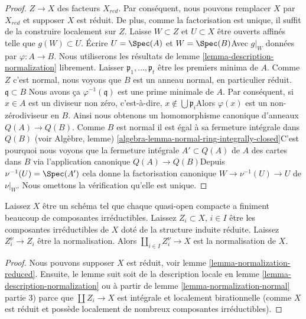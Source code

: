 \begin{proof}
$Z \to X$ des facteurs $X_{red}$. Par conséquent, nous pouvons remplacer $X$ par
$X_{red}$ et supposer $X$ est réduit. De plus, comme la factorisation est unique, il suffit de la construire localement sur $Z$. Laisse $W \subset Z$ et $U \subset X$ être ouverts affinés telle que $g(W) \subset U$. Écrire $U = \Spec(A)$ et
$W = \Spec(B)$Avec $g|_W$ données par $\varphi : A \to B$. Nous utiliserons les résultats de lemme \ref{lemma-description-normalization} librement. Laisser $\mathfrak p_1, \ldots, \mathfrak p_t$ être les premiers minima de $A$. Comme $Z$ c'est normal, nous voyons que $B$ est un anneau normal, en particulier réduit. $\mathfrak q \subset B$ Nous avons ça $\varphi^{-1}(\mathfrak q)$
est une prime minimale de $A$. Par conséquent, si $x \in A$ est un diviseur non zéro, c'est-à-dire,
$x \not \in \bigcup \mathfrak p_i$Alors $\varphi(x)$ est un non-zérodiviseur en $B$. Ainsi nous obtenons un homomorphisme canonique d'anneaux $Q(A) \to Q(B)$. Comme $B$ est normal il est égal à sa fermeture intégrale dans $Q(B)$ (voir Algèbre, lemme) \ref{algebra-lemma-normal-ring-integrally-closed}C'est pourquoi nous voyons que la fermeture intégrale $A' \subset Q(A)$ de $A$
des cartes dans $B$ via l'application canonique $Q(A) \to Q(B)$Depuis $\nu^{-1}(U) = \Spec(A')$ cela donne la factorisation canonique $W \to \nu^{-1}(U) \to U$ de $\nu|_W$. Nous omettons la vérification qu'elle est unique.

\end{proof}

\begin{lemma}

\label{lemma-normalization-in-terms-of-components}
Laissez $X$ être un schéma tel que chaque quasi-open compacte a finiment beaucoup de composantes irréductibles. Laissez $Z_i \subset X$, $i \in I$ être les composantes irréductibles de $X$ doté de la structure induite réduite. Laissez $Z_i^\nu \to Z_i$ être la normalisation. Alors $\coprod_{i \in I} Z_i^\nu \to X$ est la normalisation de $X$.
\end{lemma}

\begin{proof}

Nous pouvons supposer $X$ est réduit, voir lemme \ref{lemma-normalization-reduced}. Ensuite, le lemme suit soit de la description locale en lemme \ref{lemma-description-normalization}
ou à partir de lemme \ref{lemma-normalization-normal} partie 3) parce que
$\coprod Z_i \to X$ est intégrale et localement birationnelle (comme $X$ est réduit et possède localement de nombreux composantes irréductibles).

\end{proof}

